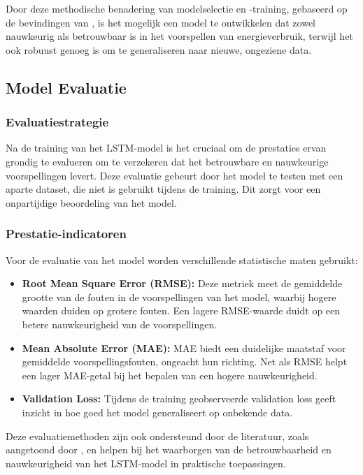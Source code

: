 Door deze methodische benadering van modelselectie en -training, gebaseerd op de bevindingen van \textcite{Wang_2020}, is het mogelijk een model te ontwikkelen dat zowel nauwkeurig als betrouwbaar is in het voorspellen van energieverbruik, terwijl het ook robuust genoeg is om te generaliseren naar nieuwe, ongeziene data.

\subsection{Model Evaluatie}

\subsubsection{Evaluatiestrategie}
Na de training van het LSTM-model is het cruciaal om de prestaties ervan grondig te evalueren om te verzekeren dat het betrouwbare en nauwkeurige voorspellingen levert. Deze evaluatie gebeurt door het model te testen met een aparte dataset, die niet is gebruikt tijdens de training. Dit zorgt voor een onpartijdige beoordeling van het model.

\subsubsection{Prestatie-indicatoren}
Voor de evaluatie van het model worden verschillende statistische maten gebruikt:
\begin{itemize}
    \item \textbf{Root Mean Square Error (RMSE):} Deze metriek meet de gemiddelde grootte van de fouten in de voorspellingen van het model, waarbij hogere waarden duiden op grotere fouten. Een lagere RMSE-waarde duidt op een betere nauwkeurigheid van de voorspellingen.
    \item \textbf{Mean Absolute Error (MAE):} MAE biedt een duidelijke maatstaf voor gemiddelde voorspellingsfouten, ongeacht hun richting. Net als RMSE helpt een lager MAE-getal bij het bepalen van een hogere nauwkeurigheid.
    \item \textbf{Validation Loss:} Tijdens de training geobserveerde validation loss geeft inzicht in hoe goed het model generaliseert op onbekende data.
\end{itemize}

Deze evaluatiemethoden zijn ook ondersteund door de literatuur, zoals aangetoond door \textcite{Wang_2020}, en helpen bij het waarborgen van de betrouwbaarheid en nauwkeurigheid van het LSTM-model in praktische toepassingen.


